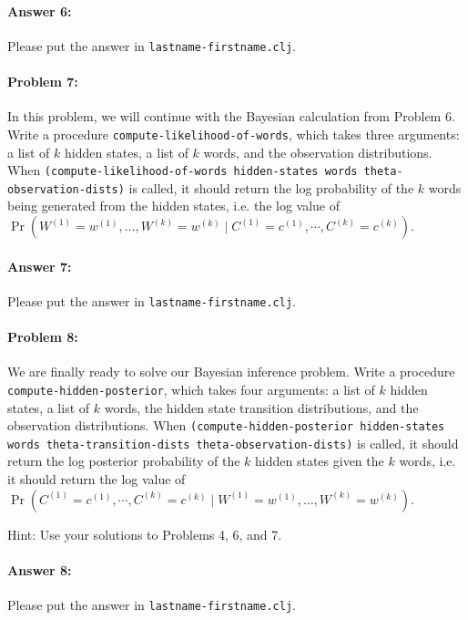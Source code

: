\documentclass[10pt]{article}
\begin{document}
\paragraph{Answer 6:} Please put the answer in
\texttt{lastname-firstname.clj}.


\hrulefill
\paragraph{Problem 7:}

In this problem, we will continue with the Bayesian calculation from
Problem 6. Write a procedure \texttt{compute-likelihood-of-words},
which takes three arguments: a list of $k$ hidden states, a list of
$k$ words, and the observation distributions. When
\texttt{(compute-likelihood-of-words hidden-states words
  theta-observation-dists)} is called, it should return the log
probability of the $k$ words being generated from the hidden states,
i.e. the log value of
$\Pr( W^{(1)}=w^{(1)},\dots,W^{(k)}=w^{(k)} \mid
C^{(1)}=c^{(1)},\cdots,C^{(k)}=c^{(k)})$.

\paragraph{Answer 7:} Please put the answer in
\texttt{lastname-firstname.clj}.


\hrulefill
\paragraph{Problem 8:}
We are finally ready to solve our Bayesian inference problem. Write a
procedure \texttt{compute-hidden-posterior}, which takes four
arguments: a list of $k$ hidden states, a list of $k$ words, the
hidden state transition distributions, and the observation
distributions. When \texttt{(compute-hidden-posterior hidden-states
  words theta-transition-dists theta-observation-dists)} is called, it
should return the log posterior probability of the $k$ hidden states
given the $k$ words, i.e. it should return the log value of
$\Pr(C^{(1)}=c^{(1)},\cdots,C^{(k)}=c^{(k)} \mid
W^{(1)}=w^{(1)},\dots,W^{(k)}=w^{(k)} )$.

\noindent Hint: Use your solutions to Problems 4, 6, and 7.


\paragraph{Answer 8:} Please put the answer in
\texttt{lastname-firstname.clj}.
\end{document}

